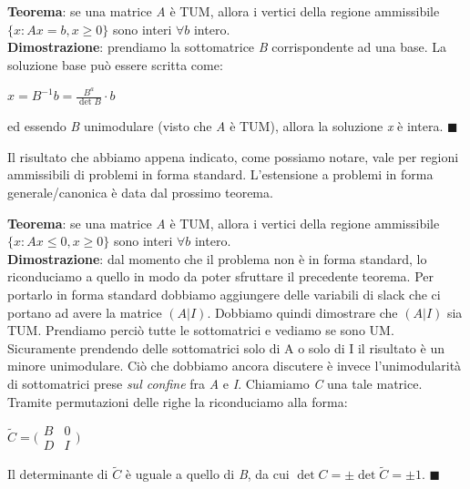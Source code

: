 \documentclass[11pt, oneside]{book}
\begin{document}
\par\bigskip

{\bf Teorema}: se una matrice {\em A} \`e TUM, allora i vertici della
regione ammissibile $\{ x : Ax = b, x \geq 0 \}$ sono interi $\forall
b$ intero.\\
{\bf Dimostrazione}: prendiamo la sottomatrice {\em B} corrispondente
ad una base. La soluzione base pu\`o essere scritta come:

\begin{center}
$x = B^{-1}b = \frac{B^a}{\det{B}}\cdot b$  
\end{center}

ed essendo {\em B} unimodulare (visto che {\em A} \`e TUM), allora la
soluzione {\em x} \`e intera. $\blacksquare$

\par\bigskip

Il risultato che abbiamo appena indicato, come possiamo notare, vale
per regioni ammissibili di problemi in forma standard. L'estensione a
problemi in forma generale/canonica \`e data dal prossimo teorema.

\par\bigskip

{\bf Teorema}: se una matrice {\em A} \`e TUM, allora i vertici della
regione ammissibile $\{x : Ax \leq 0, x \geq 0 \}$ sono interi
$\forall b$ intero.\\
{\bf Dimostrazione}: dal momento che il problema non \`e in forma
standard, lo riconduciamo a quello in modo da poter sfruttare il
precedente teorema. Per portarlo in forma standard dobbiamo aggiungere
delle variabili di slack che ci portano ad avere la matrice
$(A|I)$. Dobbiamo quindi dimostrare che $(A|I)$ sia TUM. Prendiamo
perci\`o tutte le sottomatrici e vediamo se sono UM. Sicuramente
prendendo delle sottomatrici solo di A o solo di I il risultato \`e un
minore unimodulare. Ci\`o che dobbiamo ancora discutere \`e invece
l'unimodularit\`a di sottomatrici prese {\em sul confine} fra {\em A}
e {\em I}. Chiamiamo {\em C} una tale matrice. Tramite permutazioni
delle righe la riconduciamo alla forma:

\begin{center}
$\tilde{C} = \biggr (
 \begin{array}{c|c}
  B & 0 \\
  \hline
  D & I
 \end{array}
\biggr )$
\end{center}

Il determinante di $\tilde{C}$ \`e uguale a quello di {\em B}, da cui
$\det{C} = \pm \det{\tilde{C}} = \pm 1$. $\blacksquare$
\end{document}
